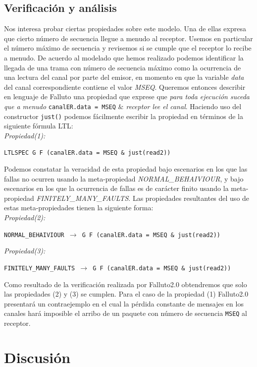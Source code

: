 \documentclass[pdftex,a4paper,12pt]{book}
\newcommand{\textff}[1]{\begin{center}\texttt{#1}\end{center}}
\begin{document}
\subsection*{Verificaci\'on y an\'alisis}
Nos interesa probar ciertas propiedades sobre este modelo. Una de ellas expresa que cierto n\'umero de secuencia llegue a menudo al receptor. Usemos en particular el n\'umero m\'aximo de secuencia y revisemos si se cumple que el receptor lo recibe a menudo. De acuerdo al modelado que hemos realizado podemos identificar la llegada de una trama con n\'umero de secuencia m\'aximo como la ocurrencia de una lectura del canal por parte del emisor, en momento en que la variable \textit{data} del canal correspondiente contiene el valor \textit{MSEQ}. Queremos entonces describir en lenguaje de Falluto una propiedad que exprese que \textit{para toda ejecuci\'on suceda que a menudo} \texttt{canalER.data = MSEQ} \textit{$\&$ receptor lee el canal}. Haciendo uso del constructor \texttt{just()} podemos f\'acilmente escribir la propiedad en t\'erminos de la siguiente f\'ormula LTL: \\

\textit{Propiedad(1):} \textff{LTLSPEC G F (canalER.data = MSEQ \& just(read2))}

Podemos constatar la veracidad de esta propiedad bajo escenarios en los que las fallas no ocurren usando la meta-propiedad \textit{NORMAL\_BEHAIVIOUR}, y bajo escenarios en los que la ocurrencia de fallas es de car\'acter finito usando la meta-propiedad \textit{FINITELY\_MANY\_FAULTS}. Las propiedades resultantes del uso de estas meta-propiedades tienen la siguiente forma:\\

\textit{Propiedad(2):} \textff{NORMAL\_BEHAIVIOUR $\rightarrow$ G~F~(canalER.data = MSEQ~\&~just(read2))}

\textit{Propiedad(3):} \textff{FINITELY\_MANY\_FAULTS $\rightarrow$ G~F~(canalER.data = MSEQ~\&~just(read2))}


Como resultado de la verificaci\'on realizada por Falluto2.0 obtendremos que solo las propiedades (2) y (3) se cumplen. Para el caso de la propiedad (1) Falluto2.0 presentar\'a un contraejemplo en el cual la p\'erdida constante de mensajes en los canales har\'a imposible el arribo de un paquete con n\'umero de secuencia \texttt{MSEQ} al receptor.

\section{Discusi\'on}
\end{document}
